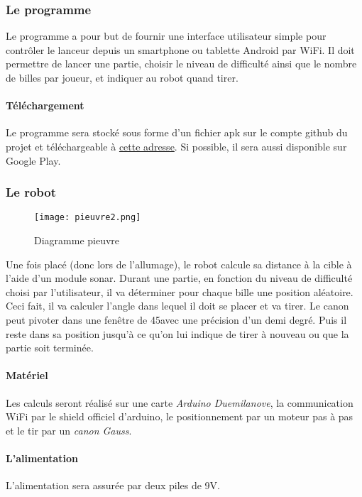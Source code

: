 \documentclass{article}
\begin{document}
\subsubsection{Le programme}
Le programme a pour but de fournir une interface utilisateur simple pour contrôler le lanceur depuis un smartphone ou tablette Android par WiFi. Il doit permettre de lancer une partie, choisir le niveau de difficulté ainsi que le nombre de billes par joueur, et indiquer au robot quand tirer.
\paragraph{Téléchargement} Le programme sera stocké sous forme d'un fichier apk sur le compte github du projet et téléchargeable à \href{https://github.com/Lanceur-billes-TPE/compte-rendu-1/downloads}{cette adresse}. Si possible, il sera aussi disponible sur Google Play.

\subsubsection{Le robot}
\begin{figure}
	\begin{center}
		\texttt{[image: pieuvre2.png]}
	\end{center}
	\caption{Diagramme pieuvre}
	\label{pieuvre}
\end{figure}

Une fois placé (donc lors de l'allumage), le robot calcule sa distance à la cible à l'aide d'un module sonar. Durant une partie, en fonction du niveau de difficulté choisi par l'utilisateur, il va déterminer pour chaque bille une position aléatoire. Ceci fait, il va calculer l'angle dans lequel il doit se placer et va tirer. Le canon peut pivoter dans une fenêtre de 45\degre avec une précision d'un demi degré. Puis il reste dans sa position jusqu'à ce qu'on lui indique de tirer à nouveau ou que la partie soit terminée.
\paragraph{Matériel} Les calculs seront réalisé sur une carte \emph{Arduino Duemilanove}, la communication WiFi par le shield officiel d'arduino, le positionnement par un moteur pas à pas et le tir par un \emph{canon Gauss}.
\paragraph{L'alimentation}
L'alimentation sera assurée par deux piles de 9V.
\end{document}
